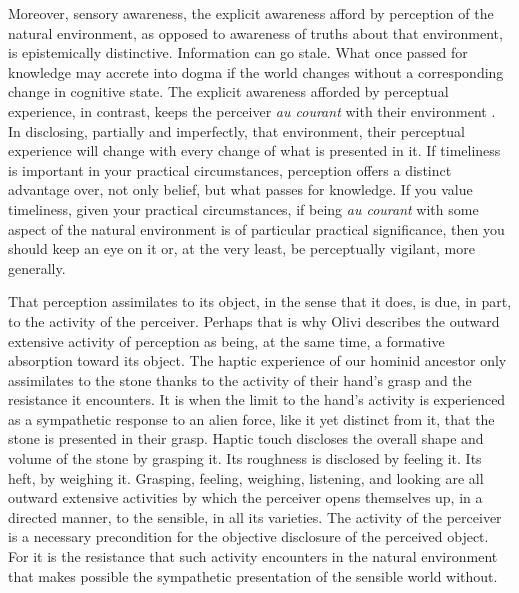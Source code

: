 Moreover, sensory awareness, the explicit awareness afford by perception of the natural environment, as opposed to awareness of truths about that environment, is epistemically distinctive. Information can go stale. What once passed for knowledge may accrete into dogma if the world changes without a corresponding change in cognitive state. The explicit awareness afforded by perceptual experience, in contrast, keeps the perceiver \emph{au courant} with their environment \citep[173--174]{Travis:2013tk}. In disclosing, partially and imperfectly, that environment, their perceptual experience will change with every change of what is presented in it. If timeliness is important in your practical circumstances, perception offers a distinct advantage over, not only belief, but what passes for knowledge. If you value timeliness, given your practical circumstances, if being \emph{au courant} with some aspect of the natural environment is of particular practical significance, then you should keep an eye on it or, at the very least, be perceptually vigilant, more generally.

That perception assimilates to its object, in the sense that it does, is due, in part, to the activity of the perceiver. Perhaps that is why Olivi describes the outward extensive activity of perception as being, at the same time, a formative absorption toward its object.  The haptic experience of our hominid ancestor only assimilates to the stone thanks to the activity of their hand's grasp and the resistance it encounters. It is when the limit to the hand's activity is experienced as a sympathetic response to an alien force, like it yet distinct from it, that the stone is presented in their grasp. Haptic touch discloses the overall shape and volume of the stone by grasping it. Its roughness is disclosed by feeling it. Its heft, by weighing it. Grasping, feeling, weighing, listening, and looking are all outward extensive activities by which the perceiver opens themselves up, in a directed manner, to the sensible, in all its varieties. The activity of the perceiver is a necessary precondition for the objective disclosure of the perceived object. For it is the resistance that such activity encounters in the natural environment that makes possible the sympathetic presentation of the sensible world without.


